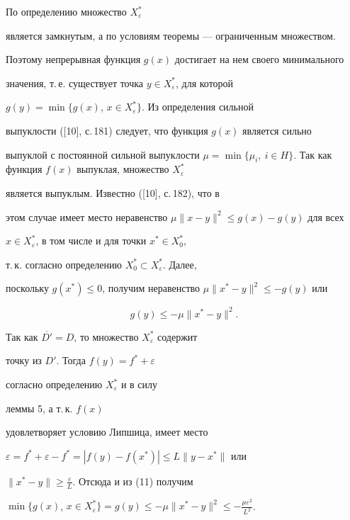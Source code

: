 \begin{pf}


По определению множество $X_{\varepsilon}^*$


является замкнутым, а по условиям теоремы --- ограниченным множеством.


Поэтому непрерывная функция $g(x)$ достигает на нем своего минимального


значения, т.\,е. существует точка $y\in X_{\varepsilon}^*$, для которой


$g(y)=\min\{g(x)$, $x\in X_{\varepsilon}^*\}$. Из определения сильной


выпуклости ([10], с.\,181) следует, что функция $g(x)$ является сильно 


выпуклой с постоянной сильной выпуклости $\mu=\min\{\mu_i,\ i\in


H\}$. Так как функция $f(x)$ выпуклая, множество $X_{\varepsilon}^*$ 


является выпуклым. Известно ([10], с.\,182), что в


этом случае имеет место неравенство $\mu\|x-y\|^2\le g(x)-g(y)$ для всех


$x\in X_{\varepsilon}^*$, в том числе и для точки $x^*\in X_0^*$,


т.\,к. согласно определению $X_0^*\subset X_{\varepsilon}^*$. Далее,


поскольку $g(x^*)\le 0$, получим неравенство $\mu\|x^*-y\|^2\le


-g(y)$ или


\begin{equation}


g(y)\le -\mu\|x^*-y\|^2.


\end{equation}


Так как $\overline{D'}=D$, то множество $X_{\varepsilon}^*$ содержит


точку из $D'$. Тогда $f(y)=f^*+\varepsilon$


согласно определению $X_{\varepsilon}^*$ и в силу 


леммы 5, а т.\,к. $f(x)$


удовлетворяет условию Липшица, имеет место 


$\varepsilon=f^*+\varepsilon-f^*=|f(y)-f(x^*)|\le L\|y-x^*\|$ или


$\|x^*-y\|\ge \frac{\varepsilon}{L}$. Отсюда и из (11) получим


$\min\{g(x)$, $x\in X_{\varepsilon}^*\}=g(y)\le -\mu\|x^*-y\|^2\le


-\frac{\mu\varepsilon^2}{L^2}$.


\end{pf}






